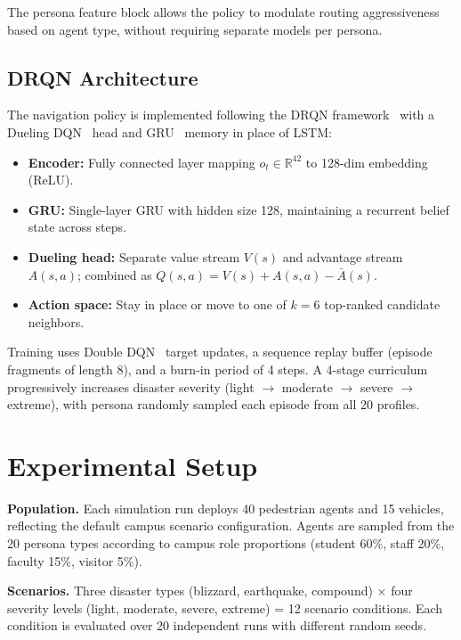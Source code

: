 \documentclass[11pt]{article}
\begin{document}
The persona feature block allows the policy to modulate routing aggressiveness based on agent type, without requiring separate models per persona.

\subsection{DRQN Architecture}

The navigation policy is implemented following the DRQN framework~\cite{hausknecht2015} with a Dueling DQN~\cite{wang2016} head and GRU~\cite{cho2014gru} memory in place of LSTM:
\begin{itemize}
  \item \textbf{Encoder:} Fully connected layer mapping $o_t \in \mathbb{R}^{42}$ to 128-dim embedding (ReLU).
  \item \textbf{GRU:} Single-layer GRU with hidden size 128, maintaining a recurrent belief state across steps.
  \item \textbf{Dueling head:} Separate value stream $V(s)$ and advantage stream $A(s,a)$; combined as $Q(s,a) = V(s) + A(s,a) - \bar{A}(s)$.
  \item \textbf{Action space:} Stay in place or move to one of $k=6$ top-ranked candidate neighbors.
\end{itemize}

Training uses Double DQN~\cite{vanHasselt2016} target updates, a sequence replay buffer (episode fragments of length 8), and a burn-in period of 4 steps. A 4-stage curriculum~\cite{bengio2009curriculum} progressively increases disaster severity (light $\rightarrow$ moderate $\rightarrow$ severe $\rightarrow$ extreme), with persona randomly sampled each episode from all 20 profiles.

\section{Experimental Setup}

\textbf{Population.} Each simulation run deploys 40 pedestrian agents and 15 vehicles, reflecting the default campus scenario configuration. Agents are sampled from the 20 persona types according to campus role proportions (student 60\%, staff 20\%, faculty 15\%, visitor 5\%).

\textbf{Scenarios.} Three disaster types (blizzard, earthquake, compound) $\times$ four severity levels (light, moderate, severe, extreme) = 12 scenario conditions. Each condition is evaluated over 20 independent runs with different random seeds.
\end{document}
